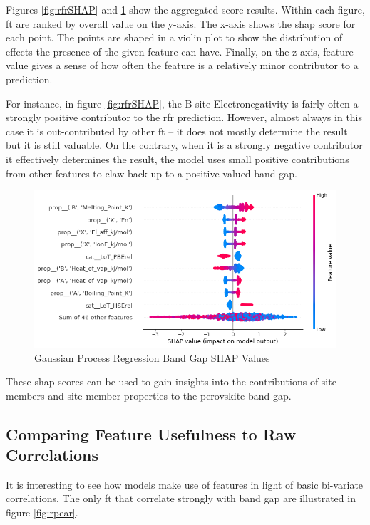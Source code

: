 \documentclass[aip, jmp, amsmath, amssymb, nofootinbib]{revtex4-2}
\begin{document}
Figures \ref{fig:rfrSHAP} and \ref{fig:gprSHAP} show the aggregated score
results. Within each figure, \gls{ft} are ranked by overall value on
the y-axis. The x-axis shows the \acrshort{shap} score for each point. The points
are shaped in a violin plot to show the distribution of effects the
presence of the given feature can have. Finally, on the z-axis,
feature value gives a sense of how often the feature is a relatively
minor contributor to a prediction.

For instance, in figure \ref{fig:rfrSHAP}, the B-site Electronegativity
is fairly often a strongly positive contributor to the \acrshort{rfr}
prediction. However, almost always in this case it is out-contributed
by other \gls{ft} -- it does not mostly determine the result but it is
still valuable. On the contrary, when it is a strongly negative
contributor it effectively determines the result, the model uses small
positive contributions from other features to claw back up to a
positive valued band gap.

\begin{figure}[htbp]
\centering
\includegraphics[width=450pt]{./GPR/.ob-jupyter/df8f4cdfbd4884fe978d0b0dc85e13e95137248c.png}
\caption{\label{fig:gprSHAP} Gaussian Process Regression Band Gap SHAP Values}
\end{figure}

These \acrshort{shap} scores can be used to gain insights into the contributions
of site members and site member properties to the perovskite band
gap.

\subsection*{Comparing Feature Usefulness to Raw Correlations}
\label{sec:org290554b}
It is interesting to see how models make use of features in light of
basic bi-variate correlations. The only \gls{ft} that correlate
strongly with band gap are illustrated in figure \ref{fig:rpear}.
\end{document}
